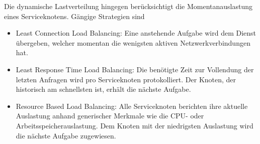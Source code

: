 Die dynamische Lastverteilung hingegen berücksichtigt die Momentanauslastung eines Serviceknotens. Gängige Strategien sind
\begin{itemize}
	\item Least Connection Load Balancing: Eine anstehende Aufgabe wird dem Dienst übergeben, welcher momentan die wenigsten aktiven Netzwerkverbindungen hat.
	\item Least Response Time Load Balancing: Die benötigte Zeit zur Vollendung der letzten Anfragen wird pro Serviceknoten protokolliert. Der Knoten, der historisch am schnellsten ist, erhält die nächste Aufgabe.
	\item Resource Based Load Balancing: Alle Serviceknoten berichten ihre aktuelle Auslastung anhand generischer Merkmale wie die CPU- oder Arbeitsspeicherauslastung. Dem Knoten mit der niedrigsten Auslastung wird die nächste Aufgabe zugewiesen.
\end{itemize}















